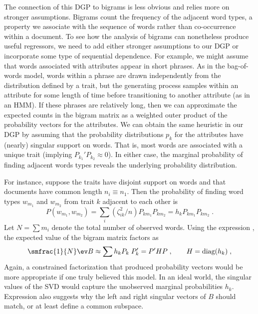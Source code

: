 \documentclass[12pt]{article}
\begin{document}
The connection of this DGP to bigrams is less obvious and relies more on stronger assumptions.  Bigrams count the frequency of the adjacent word types, a property we associate with the sequence of words rather than co-occurrence within a document.  To see how the analysis of bigrams can nonetheless produce useful regressors, we need to add either stronger assumptions to our DGP or incorporate some type of sequential dependence.  For example, we might assume that words associated with attributes appear in short phrases.   As in the bag-of-words model, words within a phrase are drawn independently from the distribution defined by a trait, but the generating process samples within an attribute for some length of time before transitioning to another attribute (as in an HMM).  If these phrases are relatively long, then we can approximate the expected counts in the bigram matrix as a weighted outer product of the probability vectors for the attributes.  We can obtain the same heuristic in our DGP by assuming that the probability distributions $p_k$ for the attributes  have (nearly) singular support on words.  That is, most words are associated with a unique trait (implying $P_{k_1}'P_{k_2}  \approx 0$).  In either case, the marginal probability of finding adjacent words types reveals the underlying probability distribution.  


For instance, suppose the traits have disjoint support on words and that documents have common length $n_i \equiv n_1$. Then the probability of finding  word types  $w_{m_1}$ and $w_{m_2}$ from trait $k$ adjacent to each other is 
 \begin{equation}
  P(w_{m_1},w_{m_2}) = \sum_i \left(\zeta_{ik}^2/n \right) P_{km_1} P_{km_2} 
                                     = h_k P_{km_1} P_{km_2}  \;.
  \label{eq:joint}
\end{equation}
Let $N = \sum m_i$ denote the total number of observed words. Using the expression , the expected value of the bigram matrix factors as
 \begin{equation}
    \smfrac{1}{N} \ev B \approx \sum h_k P_k\; P_k' = P' H P \;, 
                     \qquad  H = \mbox{diag}(h_k)\;,
 \label{eq:B2}
 \end{equation}
Again, a constrained factorization that produced probability vectors would be more appropriate if one truly believed this model.  In an ideal world, the singular values of the SVD would capture the unobserved marginal probabilities  $h_k$.  Expression  also suggests why the left and right singular vectors of $B$ should match, or at least define a common subspace.
\end{document}
